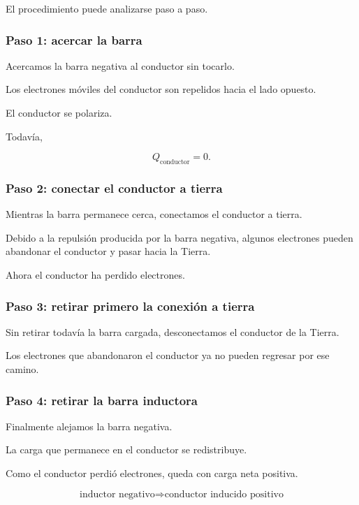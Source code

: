 El procedimiento puede analizarse paso a paso.

\subsubsection*{Paso 1: acercar la barra}

Acercamos la barra negativa al conductor sin tocarlo.

Los electrones móviles del conductor son repelidos hacia el lado opuesto.

El conductor se polariza.

Todavía,

\[
Q_{\text{conductor}}=0.
\]


\subsubsection*{Paso 2: conectar el conductor a tierra}

Mientras la barra permanece cerca, conectamos el conductor a tierra.

Debido a la repulsión producida por la barra negativa, algunos electrones
pueden abandonar el conductor y pasar hacia la Tierra.

Ahora el conductor ha perdido electrones.


\subsubsection*{Paso 3: retirar primero la conexión a tierra}

Sin retirar todavía la barra cargada, desconectamos el conductor de la
Tierra.

Los electrones que abandonaron el conductor ya no pueden regresar por ese
camino.


\subsubsection*{Paso 4: retirar la barra inductora}

Finalmente alejamos la barra negativa.

La carga que permanece en el conductor se redistribuye.

Como el conductor perdió electrones, queda con carga neta positiva.

\begin{equation}
    \boxed{
    \text{inductor negativo}
    \Longrightarrow
    \text{conductor inducido positivo}
    }
\end{equation}


